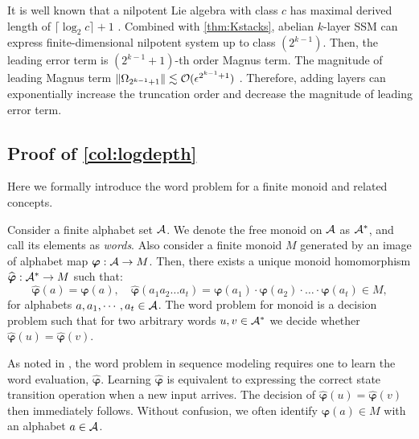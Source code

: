It is well known that
a nilpotent Lie algebra with class $c$ has maximal derived length of $\lceil \log_2 c \rceil + 1$ \cite{burde2012derived}.
Combined with \cref{thm:Kstacks}, abelian $k$-layer SSM can
express finite-dimensional nilpotent system up to class $(2^{k-1})$.
Then, the leading error term is $(2^{k-1}+1)$-th order Magnus term.
The magnitude of leading Magnus term $\|\Omega_{2^{k-1}+1}\| \lesssim \mathcal{O}(\epsilon^{2^{k-1}+1})$ \cite{blanes2009magnus}.
Therefore, adding layers can exponentially increase the truncation order
and decrease the magnitude of leading error term.
\subsection{Proof of \cref{col:logdepth}}
\label{app:sub_proof_logdepth}
Here we formally introduce the word problem for a finite monoid and related concepts.
\begin{definition}
\label{app:def_formal_wordproblem}
    Consider a finite alphabet set $\mathcal{A}$.
    We denote the free monoid on $\mathcal{A}$ as $\mathcal{A}^\ast$, and call its elements as \emph{words}.
    Also consider a finite monoid $M$ generated by an image of alphabet map $\boldsymbol\varphi: \mathcal{A} \to M$.
    Then, there exists a unique monoid homomorphism $\widehat{\boldsymbol\varphi}:\mathcal{A}^\ast \to M$ such that:
    \begin{equation*}
        \widehat{\boldsymbol\varphi}(a) = \boldsymbol\varphi (a),
        \quad
        \widehat{\boldsymbol\varphi}(a_1a_2\ldots a_t) = \boldsymbol\varphi (a_1) \cdot \boldsymbol\varphi (a_2) \cdot \ldots \cdot \boldsymbol\varphi (a_t) \in M,
    \end{equation*}
    for alphabets $a, a_1, \cdots, a_t \in \mathcal{A}$.
    The word problem for monoid is a decision problem such that for two arbitrary words $u, v \in \mathcal{A}^\ast$ we decide whether $\widehat{\boldsymbol\varphi} (u) = \widehat{\boldsymbol\varphi} (v)$.
\end{definition}
As noted in \citet{merrill2024illusion}, the word problem in sequence modeling requires one to learn the word evaluation, $\widehat{\boldsymbol\varphi}$.
Learning $\widehat{\boldsymbol\varphi}$ is equivalent to expressing the correct state transition operation when a new input arrives.
The decision of $\widehat{\boldsymbol\varphi} (u) = \widehat{\boldsymbol\varphi} (v)$ then immediately follows. Without confusion, we often identify $\boldsymbol\varphi (a) \in M$ with an alphabet $a \in \mathcal{A}$.
